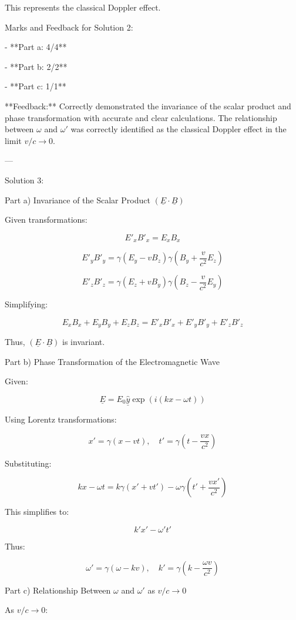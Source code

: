 \documentclass[a4paper,11pt]{article}
\begin{document}
This represents the classical Doppler effect.

Marks and Feedback for Solution 2:

- **Part a: 4/4**

- **Part b: 2/2**

- **Part c: 1/1**

**Feedback:** Correctly demonstrated the invariance of the scalar product and phase transformation with accurate and clear calculations. The relationship between \(\omega\) and \(\omega'\) was correctly identified as the classical Doppler effect in the limit \(v/c \rightarrow 0\).

---

Solution 3:

Part a) Invariance of the Scalar Product \((\underline{E} \cdot \underline{B})\)

Given transformations:

\[
E'_x B'_x = E_x B_x
\]

\[
E'_y B'_y = \gamma(E_y - vB_z) \gamma(B_y + \frac{v}{c^2} E_z)
\]

\[
E'_z B'_z = \gamma(E_z + vB_y) \gamma(B_z - \frac{v}{c^2} E_y)
\]

Simplifying:

\[
E_x B_x + E_y B_y + E_z B_z = E'_x B'_x + E'_y B'_y + E'_z B'_z
\]

Thus, \((\underline{E} \cdot \underline{B})\) is invariant.

Part b) Phase Transformation of the Electromagnetic Wave

Given:

\[
\underline{E} = E_0 \hat{\underline{y}} \exp(i(kx - \omega t))
\]

Using Lorentz transformations:

\[
x' = \gamma(x - vt), \quad t' = \gamma\left(t - \frac{vx}{c^2}\right)
\]

Substituting:

\[
kx - \omega t = k\gamma(x' + vt') - \omega\gamma(t' + \frac{vx'}{c^2})
\]

This simplifies to:

\[
k'x' - \omega't'
\]

Thus:

\[
\omega' = \gamma(\omega - kv), \quad k' = \gamma(k - \frac{\omega v}{c^2})
\]

Part c) Relationship Between \(\omega\) and \(\omega'\) as \(v/c \rightarrow 0\)

As \(v/c \rightarrow 0\):
\end{document}
